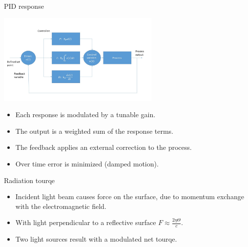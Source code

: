 \documentclass{beamer}
\begin{document}
\begin{frame}{PID response}
	\begin{center}		
		\includegraphics[width=0.6\textwidth,keepaspectratio]{pid_diagram_powerpoint.jpg}
    \end{center}
	\begin{itemize}
	
		\item Each response is modulated by a tunable gain. 
		\item The output is a weighted sum of the response terms.
		\pause
		\item The feedback applies an external correction to the process.	
		\item Over time error is minimized (damped motion).
	\end{itemize}
\end{frame}
\begin{frame}{\hypertarget{frame:Radiation tourqe}{Radiation tourqe}}
	
	\begin{itemize}		
		
		\item Incident light beam causes force on the surface, due to momentum exchange with the electromagnetic field.
		\pause
		\item With light perpendicular to a reflective surface $F  \approx\frac{2\eta\Theta}{{c}} $.
		\item Two light sources result with a modulated net tourqe.
		
	\end{itemize}
\end{frame}
\end{document}
